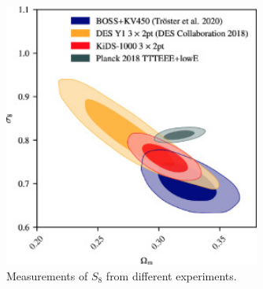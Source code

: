 \begin{figure}[ht]
	\centering
	\includegraphics[width=0.75\textwidth]{plots/s8_tension.jpg}
	\caption{Measurements of $S_8$ from different experiments.}
	\label{fig:s8_tension}
\end{figure}








